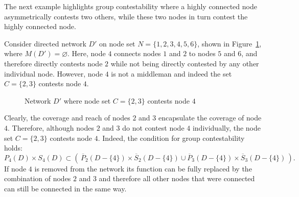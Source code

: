The next example highlights group contestability where a highly connected node asymmetrically contests two others, while these two nodes in turn contest the highly connected node.

\begin{example} \label{Group Contestability}
Consider directed network $D'$ on node set $N = \{1,2,3,4,5,6\}$, shown in Figure~\ref{Complex Contestability}, where $M(D') = \varnothing$. Here, node $4$ connects nodes $1$ and $2$ to nodes $5$ and $6$, and therefore directly contests node $2$ while not being directly contested by any other individual node. However, node $4$ is not a middleman and indeed the set $ C= \{ 2,3 \}$ contests node $4$.

\begin{figure}[h]
\begin{center}
\caption[Network where node set $C = \{ 2,3 \}$ contests node $4$]{Network $D'$ where node set $C = \{ 2,3 \}$ contests node $4$}
\label{Complex Contestability}
\end{center}
\end{figure}

\noindent
Clearly, the coverage and reach of nodes $2$ and $3$ encapsulate the coverage of node $4$. Therefore, although nodes $2$ and $3$ do not contest node $4$ individually, the node set $C = \{ 2,3 \}$ contests node $4$. Indeed, the condition for group contestability holds:
\begin{equation}
P_{4}(D) \times S_{4}(D) \subset \left( \, \overline{P}_{2}(D - \{4\}) \times \overline{S}_{2}(D - \{4\}) \cup \overline{P}_{3}(D - \{4\}) \times \overline{S}_{3}(D - \{4\}) \, \right).
\end{equation}
If node $4$ is removed from the network its function can be fully replaced by the combination of nodes $2$ and $3$ and therefore all other nodes that were connected can still be connected in the same way.
\end{example}

